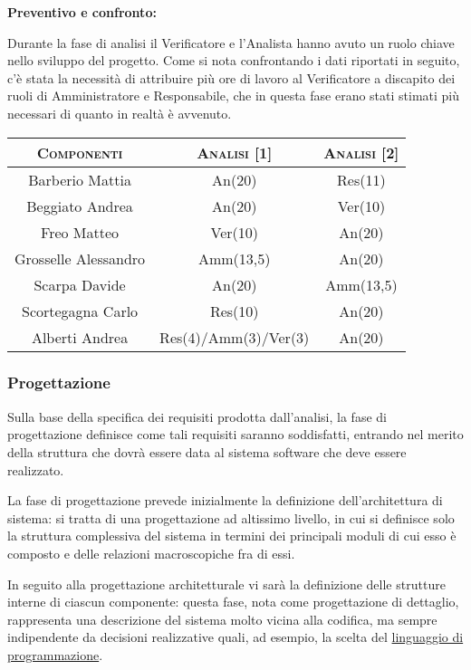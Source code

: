 \documentclass[11pt,a4paper]{article}
\begin{document}
\bigskip \bigskip
\begin{large}\textbf{Preventivo e confronto:}\end{large}
\newline
Durante la fase di analisi il Verificatore e l'Analista hanno avuto un ruolo chiave nello sviluppo del progetto.
Come si nota confrontando i dati riportati in seguito, c'è stata la necessità di attribuire più ore di lavoro al Verificatore a discapito dei ruoli di Amministratore e Responsabile, che in questa fase erano stati stimati più necessari di quanto in realtà è avvenuto.
\\
\begin{center}
\begin{tabular}{|c||c|c|}
\hline
\textsc{Componenti} & \textsc{Analisi [1]} & \textsc{Analisi [2]} \\ \hline \hline
Barberio Mattia & An(20) & Res(11) \\ \hline
Beggiato Andrea & An(20) & Ver(10) \\ \hline
Freo Matteo & Ver(10) & An(20) \\ \hline
Grosselle Alessandro & Amm(13,5) & An(20) \\ \hline
Scarpa Davide & An(20) & Amm(13,5) \\ \hline
Scortegagna Carlo & Res(10) & An(20) \\ \hline
Alberti Andrea & Res(4)/Amm(3)/Ver(3) & An(20) \\ \hline
\end{tabular}
\end{center}
\bigskip
\subsubsection{Progettazione}
Sulla base della specifica dei requisiti prodotta dall'analisi, la fase di progettazione definisce come tali requisiti saranno soddisfatti, entrando nel merito della struttura che dovrà essere data al sistema software che deve essere realizzato.

La fase di progettazione prevede inizialmente la definizione dell'architettura di sistema: si tratta di una progettazione ad altissimo livello, in cui si definisce solo la struttura complessiva del sistema in termini dei principali moduli di cui esso è composto e delle relazioni macroscopiche fra di essi.

In seguito alla progettazione architetturale vi sarà la definizione delle strutture interne di ciascun componente: questa fase, nota come progettazione di dettaglio, rappresenta una descrizione del sistema molto vicina alla codifica, ma sempre indipendente da decisioni realizzative quali, ad esempio, la scelta del \underline{linguaggio di programmazione}.
\end{document}
